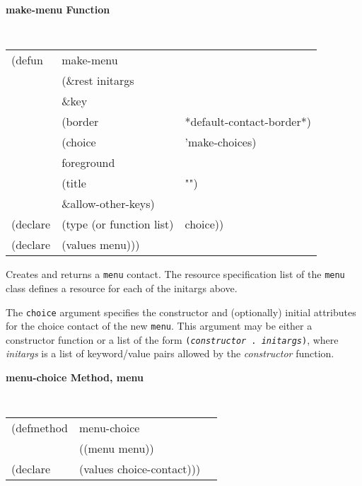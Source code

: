 {\samepage
{\large {\bf make-menu \hfill Function}} 
\begin{flushright} \parbox[t]{6.125in}{
\tt
\begin{tabular}{lll}
\raggedright
(defun & make-menu \\
       & (\&rest initargs \\
       & \&key  \\ 
       & (border                & *default-contact-border*) \\ 
       & (choice                & 'make-choices)\\    
       & foreground \\
       & (title                 & "")\\    
       & \&allow-other-keys) \\
(declare & (type (or function list)& choice))\\
(declare & (values   menu)))
\end{tabular}
\rm

}\end{flushright}}

\begin{flushright} \parbox[t]{6.125in}{
Creates and returns a {\tt menu} contact.
The resource specification list of the {\tt menu} class defines
a resource for each of the initargs above.

The {\tt choice} argument specifies the constructor and (optionally) initial
attributes for the choice contact of the new {\tt menu}.  This argument may be
either a constructor function or a list of the form {\tt ({\em constructor} .
{\em initargs})}, where {\em initargs} is a list of keyword/value pairs allowed by
the {\em constructor} function.

}\end{flushright}

{\samepage
{\large {\bf menu-choice \hfill Method, menu}}
\begin{flushright} \parbox[t]{6.125in}{
\tt
\begin{tabular}{lll}
\raggedright
(defmethod & menu-choice & \\
& ((menu  menu)) \\
(declare & (values choice-contact)))
\end{tabular}
\rm

}\end{flushright}}


